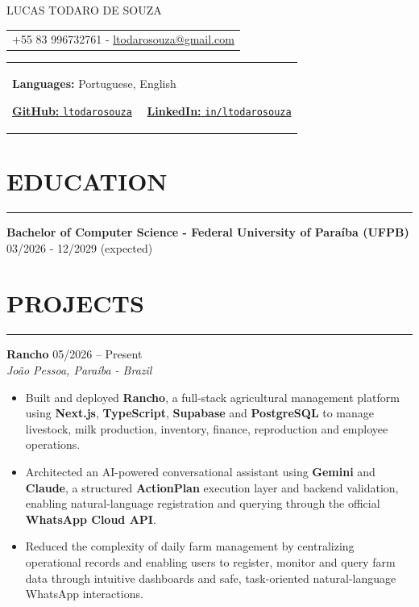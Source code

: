 \documentclass[10pt,a4paper]{article}
\begin{document}
\pagestyle{empty}

\begin{center}

{\Huge LUCAS TODARO DE SOUZA} 
\begin{center}
\begin{tabular}{l}
{+55 83 996732761 -} 
\href{mailto:ltodarosouza@gmail.com}{ltodarosouza@gmail.com}
  \\
 \end{tabular}
\end{center}
\end{center}
\begin{tabular}{l}

\textbf{Languages:} Portuguese, English  \

\href{https://github.com/ltodarosouza}{\textbf{GitHub:} \texttt{ltodarosouza}} 
\ \  
\href{https://www.linkedin.com/in/ltodarosouza/}{\textbf{LinkedIn:} \texttt{in/ltodarosouza}} 

\end{tabular}
\section*{EDUCATION}
\vspace{-2.5mm}
\hrule
\vspace{1.2mm}


\textbf{Bachelor of Computer Science - Federal University of Paraíba (UFPB) } \hfill 03/2026 - 12/2029 (expected)

\section*{PROJECTS}
\vspace{-2.5mm}
\hrule  
\vspace{1.2mm}

\textbf{Rancho} \hfill 05/2026 -- Present \\
\textit{João Pessoa, Paraíba - Brazil}
\begin{itemize}[leftmargin=*,itemsep=-2pt,topsep=1pt]
    \item Built and deployed \textbf{Rancho}, a full-stack agricultural management platform using \textbf{Next.js}, \textbf{TypeScript}, \textbf{Supabase} and \textbf{PostgreSQL} to manage livestock, milk production, inventory, finance, reproduction and employee operations.
    \item Architected an AI-powered conversational assistant using \textbf{Gemini} and \textbf{Claude}, a structured \textbf{ActionPlan} execution layer and backend validation, enabling natural-language registration and querying through the official \textbf{WhatsApp Cloud API}.
    \item Reduced the complexity of daily farm management by centralizing operational records and enabling users to register, monitor and query farm data through intuitive dashboards and safe, task-oriented natural-language WhatsApp interactions.
\end{itemize}
\end{document}
